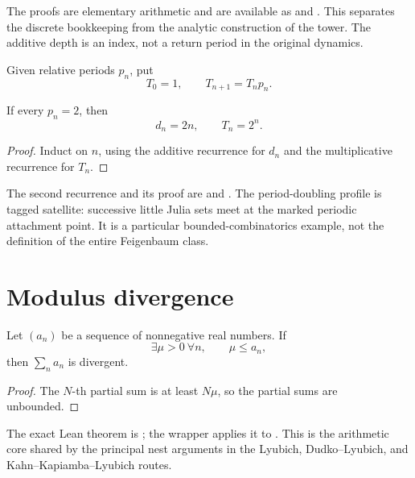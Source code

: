 The proofs are elementary arithmetic and are available as
 and
.  This separates the discrete
bookkeeping from the analytic construction of the tower.  The additive
depth is an index, not a return period in the original dynamics.

\begin{definition}
Given relative periods $p_n$, put
\[
 T_0=1,\qquad T_{n+1}=T_np_n.
\]
\end{definition}

\begin{proposition}
If every $p_n=2$, then
\[
 d_n=2n,\qquad T_n=2^n.
\]
\end{proposition}

\begin{proof}
Induct on $n$, using the additive recurrence for $d_n$ and the
multiplicative recurrence for $T_n$.
\end{proof}

The second recurrence and its proof are
 and
.
The period-doubling profile is tagged satellite: successive little
Julia sets meet at the marked periodic attachment point.
It is a particular bounded-combinatorics example, not the definition
of the entire Feigenbaum class.

\section{Modulus divergence}

\begin{lemma}
\label{lem:combinatorial-modulus-lower}
Let $(a_n)$ be a sequence of nonnegative real numbers.  If
\[
 \exists\mu>0\ \forall n,\qquad \mu\le a_n,
\]
then $\sum_n a_n$ is divergent.
\end{lemma}

\begin{proof}
The $N$-th partial sum is at least $N\mu$, so the partial sums are
unbounded.
\end{proof}

The exact Lean theorem is
; the wrapper
 applies it to
.  This is the arithmetic core shared by the principal
nest arguments in the Lyubich, Dudko--Lyubich, and Kahn--Kapiamba--Lyubich
routes.

